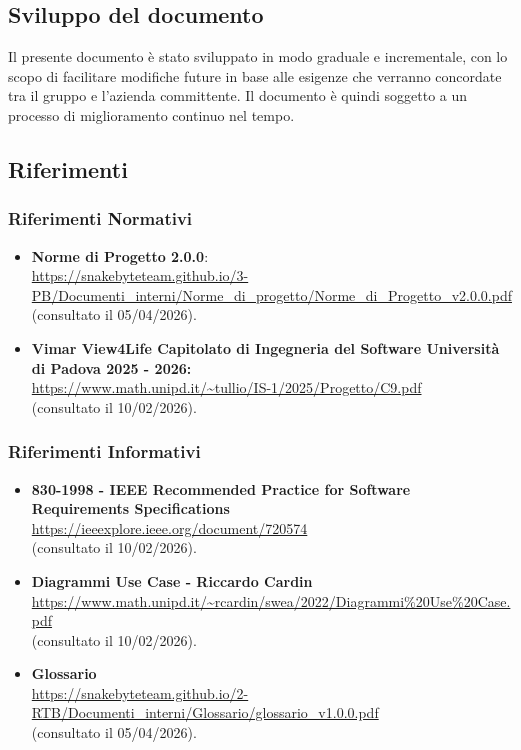 \documentclass[10pt, letterpaper]{article}
\begin{document}
\subsection{Sviluppo del documento}{
    Il presente documento è stato sviluppato in modo graduale e incrementale, con lo scopo di facilitare modifiche future in base alle esigenze che verranno concordate tra il gruppo e l'azienda committente. Il documento è quindi soggetto a un processo di miglioramento continuo nel tempo.
}

\subsection{Riferimenti}

\subsubsection{Riferimenti Normativi}
\begin{itemize}
    \item \textbf{Norme di Progetto 2.0.0}:
          \\ \url{https://snakebyteteam.github.io/3-PB/Documenti_interni/Norme_di_progetto/Norme_di_Progetto_v2.0.0.pdf}
          \\(consultato il 05/04/2026).

    \item \textbf{Vimar View4Life Capitolato di Ingegneria del Software Università di Padova 2025 - 2026:}
          \\ \url{https://www.math.unipd.it/~tullio/IS-1/2025/Progetto/C9.pdf}
          \\ (consultato il 10/02/2026).
\end{itemize}

\subsubsection{Riferimenti Informativi}
\begin{itemize}
    \item \textbf{830-1998 - IEEE Recommended Practice for Software Requirements Specifications}
          \\ \url{https://ieeexplore.ieee.org/document/720574}
          \\ (consultato il 10/02/2026).

    \item \textbf{Diagrammi Use Case - Riccardo Cardin}
          \\ \url{https://www.math.unipd.it/~rcardin/swea/2022/Diagrammi%20Use%20Case.pdf} 
          \\ (consultato il 10/02/2026).
    \item \textbf{Glossario}
          \\ \url{https://snakebyteteam.github.io/2-RTB/Documenti_interni/Glossario/glossario_v1.0.0.pdf}
          \\ (consultato il 05/04/2026).
\end{itemize}
\end{document}
